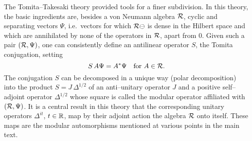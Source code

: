 The Tomita--Takesaki theory provided tools for a finer subdivision. 
In this theory, the basic ingredients are, besides a von
Neumann algebra $\cal{R}$, cyclic and separating vectors $\Psi$,
i.e.\ vectors for which $\cal R\Psi$ is dense in the
Hilbert space and which are annihilated by
none of the operators in $\cal R$, apart from $0$. Given 
such a pair $({\cal R}, \Psi)$, one can consistently define an antilinear
operator $S$, the Tomita conjugation, setting
\begin{equation}
S \, A \Psi = A^* \Psi \quad \mbox{for} \ A \in {\cal R}.
\end{equation}
The conjugation $S$ can be decomposed in a unique way 
(polar decomposition) into the   
product $S = J \, \Delta^{1/2}$ of an anti--unitary operator 
$J$ and a positive self--adjoint operator $\Delta^{1/2}$
whose square is called the modular operator affiliated with
$({\cal R}, \Psi)$. It is a central result in this theory that 
the corresponding unitary operators $\Delta^{it}$, $t \in {\Bbb R}$, map
by their adjoint action the algebra ${\cal R}$ onto itself.
These maps are 
the modular automorphisms mentioned at various points in the main text. 

